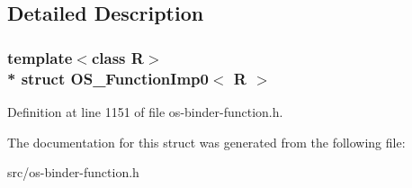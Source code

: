 \subsection{Detailed Description}
\subsubsection*{template$<$class R$>$\\*
struct O\+S\+\_\+\+Function\+Imp0$<$ R $>$}



Definition at line 1151 of file os-\/binder-\/function.\+h.



The documentation for this struct was generated from the following file\+:\begin{DoxyCompactItemize}
\item 
src/os-\/binder-\/function.\+h\end{DoxyCompactItemize}
